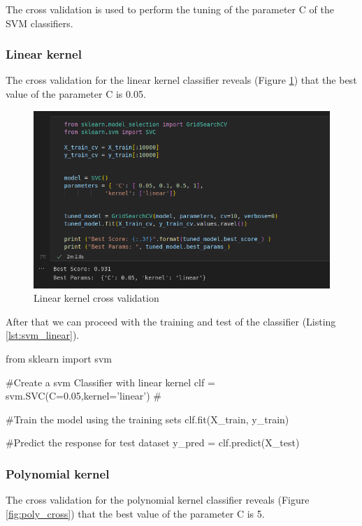 \documentclass[12pt]{article}
\begin{document}
The cross validation is used to perform the tuning of the parameter C of the SVM
classifiers.

\subsubsection{Linear kernel}

The cross validation for the linear kernel classifier reveals (Figure \ref{fig:linear_cross}) that the best 
value of the parameter C is 0.05.

\begin{figure}[H]
    \centering
    \includegraphics[scale=0.54]{linear_cross.png}
    \caption{Linear kernel cross validation}
    \label{fig:linear_cross}
\end{figure}

After that we can proceed with the training and test of the classifier 
(Listing \ref{lst:svm_linear}).

\begin{python}[caption={SVM linear kernel},label={lst:svm_linear}]
from sklearn import svm

#Create a svm Classifier with linear kernel
clf = svm.SVC(C=0.05,kernel='linear') # 

#Train the model using the training sets
clf.fit(X_train, y_train)

#Predict the response for test dataset
y_pred = clf.predict(X_test)
\end{python}
    

\subsubsection{Polynomial kernel}

The cross validation for the polynomial kernel classifier reveals (Figure \ref{fig:poly_cross}) that the best 
value of the parameter C is 5.
\end{document}
